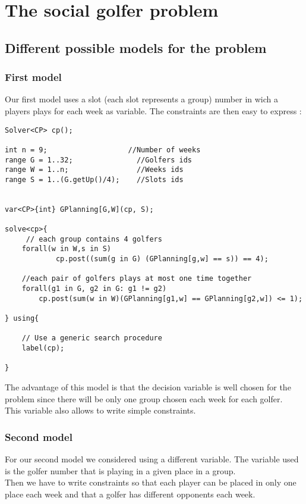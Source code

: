 \documentclass{eplDoc}
\begin{document}
\maketitle
\newpage

\section{The social golfer problem}

\subsection{Different possible models for the problem}
\subsubsection{First model}
Our first model uses a slot (each slot represents a group) number in wich a players plays for each week as variable. The constraints are then easy to express : 
\begin{lstlisting}
Solver<CP> cp();

int n = 9;                   //Number of weeks
range G = 1..32;               //Golfers ids
range W = 1..n;                //Weeks ids
range S = 1..(G.getUp()/4);    //Slots ids


var<CP>{int} GPlanning[G,W](cp, S);   

solve<cp>{
     // each group contains 4 golfers
    forall(w in W,s in S)
            cp.post((sum(g in G) (GPlanning[g,w] == s)) == 4);

    //each pair of golfers plays at most one time together
    forall(g1 in G, g2 in G: g1 != g2)
        cp.post(sum(w in W)(GPlanning[g1,w] == GPlanning[g2,w]) <= 1);

} using{

    // Use a generic search procedure
    label(cp);

}
\end{lstlisting}

The advantage of this model is that the decision variable is well chosen for the problem since there will be only one group chosen each week for each golfer. \\ 
This variable also allows to write simple constraints. \\ 

\subsubsection{Second model}
For our second model we considered using a different variable. The variable used is the golfer number that is playing in a given place in a group. \\ 
Then we have to write constraints so that each player can be placed in only one place each week and that a golfer has different opponents each week. 
\end{document}
